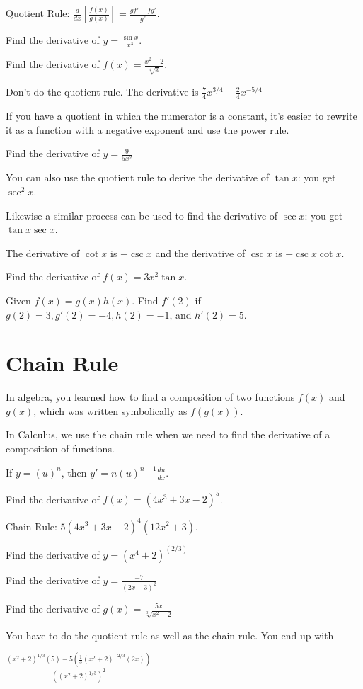\documentclass[../bccalc.tex]{subfiles}
\begin{document}
Quotient Rule: $\frac{d}{dx}\left[\frac{f(x)}{g(x)}\right] = \frac{gf'-fg'}{g^2}$.

\ex Find the derivative of $y=\frac{\sin x}{x^3}$.

\begin{example}
    Find the derivative of $f(x)=\frac{x^2+2}{\sqrt[4]{x}}$.

    Don't do the quotient rule. The derivative is $\frac{7}{4}x^{3/4}-\frac{2}{4}x^{-5/4}$
\end{example}

If you have a quotient in which the numerator is a constant, it's easier to rewrite it as a function with a negative exponent and use the power rule.

\ex Find the derivative of $y=\frac{9}{5x^2}$

You can also use the quotient rule to derive the derivative of $\tan x$: you get $\sec^2 x$.

Likewise a similar process can be used to find the derivative of $\sec x$: you get $\tan x\sec x$.

The derivative of $\cot x$ is $-\csc x$ and the derivative of $\csc x$ is $-\csc x\cot x$.

\ex Find the derivative of $f(x)=3x^2\tan x$.

\ex Given $f(x)=g(x)h(x)$. Find $f'(2)$ if $g(2)=3, g'(2)=-4, h(2)=-1$, and $h'(2)=5$.

\section{Chain Rule}
In algebra, you learned how to find a composition of two functions $f(x)$ and $g(x)$, which was written symbolically as $f(g(x))$.

In Calculus, we use the chain rule when we need to find the derivative of a composition of functions.

If $y=(u)^n$, then $y'=n(u)^{n-1}\frac{du}{dx}$.

\begin{example}
    Find the derivative of $f(x)=(4x^3+3x-2)^5$.

    Chain Rule: $5(4x^3+3x-2)^4(12x^2+3)$.
\end{example}

\ex Find the derivative of $y=(x^4+2)^(2/3)$

\ex Find the derivative of $y=\frac{-7}{(2x-3)^2}$

\begin{example}
    Find the derivative of $g(x)=\frac{5x}{\sqrt[3]{x^2+2}}$

    You have to do the quotient rule as well as the chain rule.  You end up with 

    $\frac{(x^2+2)^{1/3}(5)-5(\frac{1}{3}(x^2+2)^{-2/3}(2x))}{((x^2+2)^{1/3})^2}$
\end{example}
\end{document}

